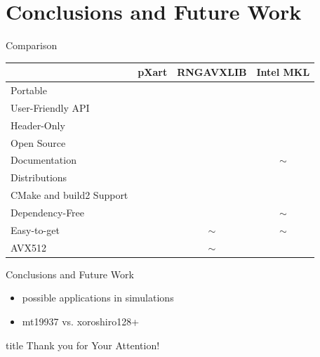 \documentclass[aspectratio=169]{beamer}
\begin{document}
  \section{Conclusions and Future Work} %
  \label{sec:conclusions}
    \begin{frame}{Comparison}
      \renewcommand{\checkmark}{\ding{52}}
      \newcommand{\crossmark}{\ding{56}}
      \begin{table}
        \begin{tabular}{lccc}
          \hline
          & pXart & RNGAVXLIB & Intel MKL \\
          \hline
          \hline
          Portable & \checkmark & \crossmark & \crossmark \\
          User-Friendly API & \checkmark & \crossmark & \crossmark \\
          Header-Only & \checkmark & \crossmark & \crossmark \\
          Open Source & \checkmark & \checkmark & \crossmark \\
          Documentation & \checkmark & \crossmark & $\sim$ \\
          Distributions & \crossmark & \checkmark & \checkmark \\
          CMake and build2 Support & \checkmark & \crossmark & \crossmark \\
          Dependency-Free & \checkmark & \checkmark & $\sim$ \\
          Easy-to-get & \checkmark & $\sim$ & $\sim$ \\
          AVX512 & \crossmark & $\sim$ & \checkmark \\
          \hline
        \end{tabular}
      \end{table}
    \end{frame}

    \begin{frame}{Conclusions and Future Work}
      \begin{itemize}
        \item possible applications in simulations
        \item mt19937 vs. xoroshiro128+
      \end{itemize}
    \end{frame}

  \begin{frame}
    \vfill
    \centering
    \begin{beamercolorbox}[sep=8pt,center,shadow=true,rounded=true]{title}
      Thank you for Your Attention!%
      \par%
    \end{beamercolorbox}
    \vfill
  \end{frame}
\end{document}
